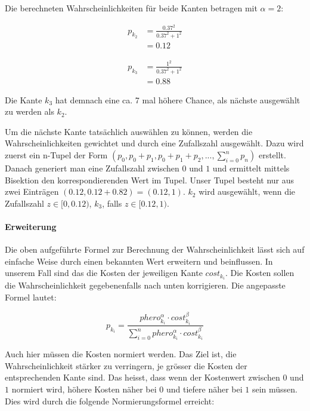 Die berechneten Wahrscheinlichkeiten für beide Kanten betragen mit $\alpha = 2$:

\begin{equation*}
\begin{split}
p_{k_2} & = \frac{0.37^2}{0.37^2 + 1^2} \\
        & = 0.12
\end{split}
\end{equation*}

\begin{equation*}
\begin{split}
p_{k_3} & = \frac{1^2}{0.37^2 + 1^2} \\
        & = 0.88
\end{split}
\end{equation*}

Die Kante $k_3$ hat demnach eine ca. 7 mal höhere Chance, als nächste ausgewählt zu werden als $k_2$.

Um die nächste Kante tatsächlich auswählen zu können, werden die Wahrscheinlichkeiten gewichtet und durch eine Zufallszahl ausgewählt. Dazu wird zuerst ein n-Tupel der Form $(p_0, p_0 + p_1, p_0 + p_1 + p_2, ..., \sum\nolimits_{i=0}^n p_n)$ erstellt. Danach generiert man eine Zufallszahl zwischen $0$ und $1$ und ermittelt mittels Bisektion den korrespondierenden Wert im Tupel. Unser Tupel besteht nur aus zwei Einträgen $(0.12, 0.12 + 0.82) = (0.12, 1)$. $k_2$ wird ausgewählt, wenn die Zufallszahl $z \in [0, 0.12)$, $k_3$, falls $z \in [0.12, 1)$.

\paragraph*{Erweiterung}

Die oben aufgeführte Formel zur Berechnung der Wahrscheinlichkeit lässt sich auf einfache Weise durch einen bekannten Wert erweitern und beinflussen. In unserem Fall sind das die Kosten der jeweiligen Kante $cost_{k_i}$. Die Kosten sollen die Wahrscheinlichkeit gegebenenfalls nach unten korrigieren. Die angepasste Formel lautet:

\[ p_{k_i} = \frac{phero_{k_i}^\alpha \cdot cost_{k_i}^\beta}{\sum\nolimits_{i=0}^n phero_{k_i}^\alpha \cdot cost_{k_i}^\beta} \] 

Auch hier müssen die Kosten normiert werden. Das Ziel ist, die Wahrscheinlichkeit stärker zu verringern, je grösser die Kosten der entsprechenden Kante sind. Das heisst, dass wenn der Kostenwert zwischen $0$ und $1$ normiert wird, höhere Kosten näher bei $0$ und tiefere näher bei $1$ sein müssen. Dies wird durch die folgende Normierungsformel erreicht:


